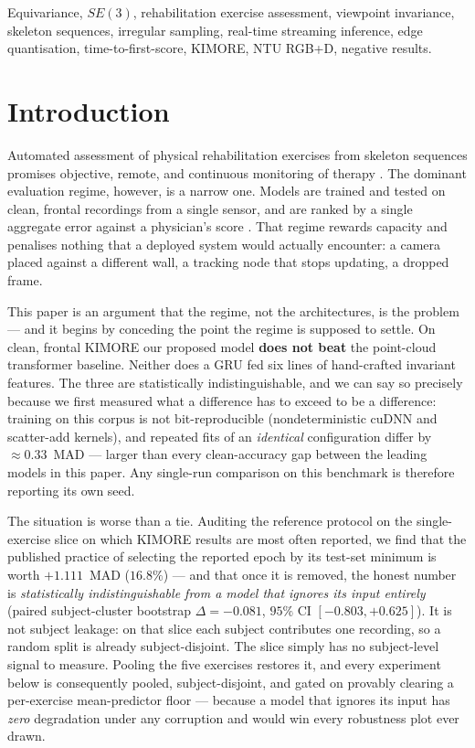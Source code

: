 \documentclass[10pt,journal]{IEEEtran}
\begin{document}
\begin{IEEEkeywords}
Equivariance, $SE(3)$, rehabilitation exercise assessment, viewpoint invariance, skeleton sequences, irregular sampling, real-time streaming inference, edge quantisation, time-to-first-score, KIMORE, NTU RGB+D, negative results.
\end{IEEEkeywords}

\section{Introduction}
\label{sec:intro}

Automated assessment of physical rehabilitation exercises from skeleton sequences promises objective, remote, and continuous monitoring of therapy \cite{capecci2019kimore}. The dominant evaluation regime, however, is a narrow one. Models are trained and tested on clean, frontal recordings from a single sensor, and are ranked by a single aggregate error against a physician's score \cite{karlov2024,abedi2023,kuang2026,pct2026}. That regime rewards capacity and penalises nothing that a deployed system would actually encounter: a camera placed against a different wall, a tracking node that stops updating, a dropped frame.

This paper is an argument that the regime, not the architectures, is the problem --- and it begins by conceding the point the regime is supposed to settle. On clean, frontal KIMORE our proposed model \textbf{does not beat} the point-cloud transformer baseline. Neither does a GRU fed six lines of hand-crafted invariant features. The three are statistically indistinguishable, and we can say so precisely because we first measured what a difference has to exceed to be a difference: training on this corpus is not bit-reproducible (nondeterministic cuDNN and scatter-add kernels), and repeated fits of an \emph{identical} configuration differ by $\approx\!0.33$~MAD --- larger than every clean-accuracy gap between the leading models in this paper. Any single-run comparison on this benchmark is therefore reporting its own seed.

The situation is worse than a tie. Auditing the reference protocol on the single-exercise slice on which KIMORE results are most often reported, we find that the published practice of selecting the reported epoch by its test-set minimum is worth $+1.111$~MAD ($16.8\%$) --- and that once it is removed, the honest number is \emph{statistically indistinguishable from a model that ignores its input entirely} (paired subject-cluster bootstrap $\Delta=-0.081$, $95\%$ CI $[-0.803,+0.625]$). It is not subject leakage: on that slice each subject contributes one recording, so a random split is already subject-disjoint. The slice simply has no subject-level signal to measure. Pooling the five exercises restores it, and every experiment below is consequently pooled, subject-disjoint, and gated on provably clearing a per-exercise mean-predictor floor --- because a model that ignores its input has \emph{zero} degradation under any corruption and would win every robustness plot ever drawn.
\end{document}
